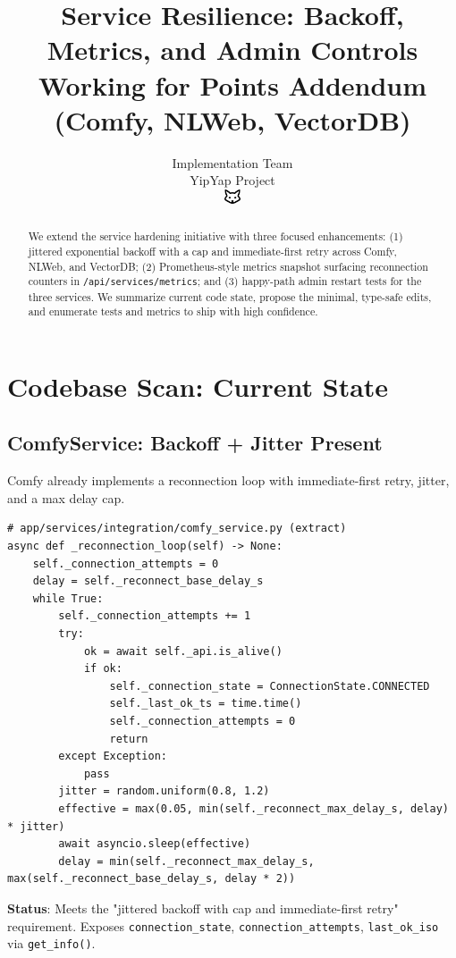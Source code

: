 \documentclass[11pt]{article}
\title{\textbf{Service Resilience: Backoff, Metrics, and Admin Controls}\\
\Large Working for Points Addendum (Comfy, NLWeb, VectorDB)}
\author{Implementation Team\\YipYap Project\\\includegraphics[width=0.5cm]{favicon.pdf}}
\begin{document}
\maketitle

\begin{abstract}
We extend the service hardening initiative with three focused enhancements: (1) jittered exponential backoff with a cap and immediate-first retry across Comfy, NLWeb, and VectorDB; (2) Prometheus-style metrics snapshot surfacing reconnection counters in \texttt{/api/services/metrics}; and (3) happy-path admin restart tests for the three services. We summarize current code state, propose the minimal, type-safe edits, and enumerate tests and metrics to ship with high confidence.
\end{abstract}

\tableofcontents
\newpage

\section{Codebase Scan: Current State}

\subsection{ComfyService: Backoff + Jitter Present}
Comfy already implements a reconnection loop with immediate-first retry, jitter, and a max delay cap.

\begin{verbatim}
# app/services/integration/comfy_service.py (extract)
async def _reconnection_loop(self) -> None:
    self._connection_attempts = 0
    delay = self._reconnect_base_delay_s
    while True:
        self._connection_attempts += 1
        try:
            ok = await self._api.is_alive()
            if ok:
                self._connection_state = ConnectionState.CONNECTED
                self._last_ok_ts = time.time()
                self._connection_attempts = 0
                return
        except Exception:
            pass
        jitter = random.uniform(0.8, 1.2)
        effective = max(0.05, min(self._reconnect_max_delay_s, delay) * jitter)
        await asyncio.sleep(effective)
        delay = min(self._reconnect_max_delay_s, max(self._reconnect_base_delay_s, delay * 2))
\end{verbatim}

\textbf{Status}: Meets the "jittered backoff with cap and immediate-first retry" requirement. Exposes \texttt{connection\_state}, \texttt{connection\_attempts}, \texttt{last\_ok\_iso} via \texttt{get\_info()}.
\end{document}
